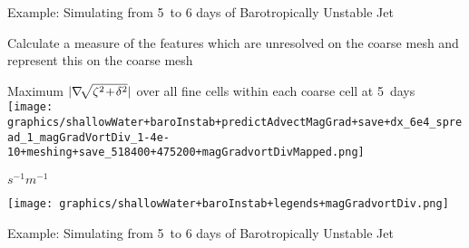 \begin{slide}
{
    \normalfont
    Example: Simulating from 5\half\ to 6 days of Barotropically Unstable Jet
}


\end{slide}

\begin{slide}
{
    \normalfont\color{purple}\large
    Calculate a measure of the features which are unresolved on the coarse mesh and represent this on the coarse mesh
}

\begin{center}

Maximum $|\nabla\negthinspace\sqrt{\zeta^2\negthinspace + \negthinspace \delta^2}|$ over all fine cells within each coarse cell at 5\half\ days
\\
\texttt{[image: graphics/shallowWater+baroInstab+predictAdvectMagGrad+save+dx\_6e4\_spread\_1\_magGradVortDiv\_1-4e-10+meshing+save\_518400+475200+magGradvortDivMapped.png]}

\begin{minipage}{0.12\linewidth}
$s^{-1}m^{-1}$
\end{minipage}\begin{minipage}{0.87\linewidth}
\texttt{[image: graphics/shallowWater+baroInstab+legends+magGradvortDiv.png]}
\end{minipage}

\end{center}

\end{slide}

\begin{slide}
{
    \normalfont
    Example: Simulating from 5\half\ to 6 days of Barotropically Unstable Jet
}


\end{slide}

